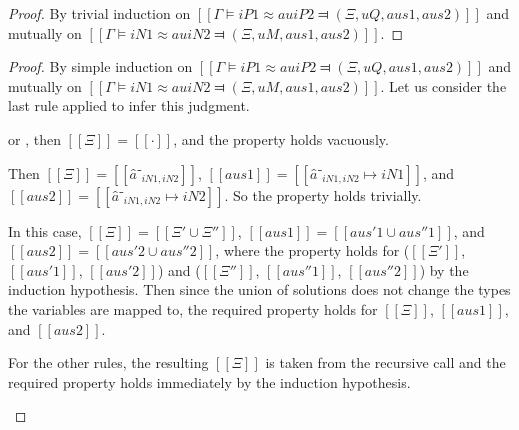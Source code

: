 \obsAuDeterministic*
\begin{proof}
    By trivial induction on $[[Γ ⊨ iP1 ≈au iP2 ⫤ (Ξ, uQ, aus1, aus2)]]$
    and mutually on $[[Γ ⊨ iN1 ≈au iN2 ⫤ (Ξ, uM, aus1, aus2)]]$.
\end{proof}

\obsNamesDefinedByMapping*
\begin{proof}
    By simple induction on $[[Γ ⊨ iP1 ≈au iP2 ⫤ (Ξ, uQ, aus1, aus2)]]$
    and mutually on $[[Γ ⊨ iN1 ≈au iN2 ⫤ (Ξ, uM, aus1, aus2)]]$.
    Let us consider the last rule applied to infer this judgment.
    \begin{caseof}
        \item {} or ,
        then $[[Ξ]] = [[·]]$, and the property holds vacuously.

        \item {}
        Then  $[[Ξ]] = [[â⁻_{iN1, iN2}]]$,
        $[[aus1]] = [[â⁻_{iN1, iN2} ↦ iN1]]$, and $[[aus2]] = [[â⁻_{iN1, iN2} ↦ iN2]]$.
        So the property holds trivially.

        \item {}
        In this case, $[[Ξ]] = [[Ξ' ∪ Ξ'']]$, $[[aus1]] = [[aus'1 ∪ aus''1]]$, and 
        $[[aus2]] = [[aus'2 ∪ aus''2]]$,
        where the property holds for ($[[Ξ']]$, $[[aus'1]]$, $[[aus'2]]$) and 
        ($[[Ξ'']]$, $[[aus''1]]$, $[[aus''2]]$) by the induction hypothesis.
        Then since the union of solutions does not change the types the variables are mapped to,
        the required property holds for $[[Ξ]]$, $[[aus1]]$, and $[[aus2]]$.

        \item For the other rules, the resulting $[[Ξ]]$ is taken from the recursive call and 
        the required property holds immediately by the induction hypothesis.
    \end{caseof}
\end{proof}

